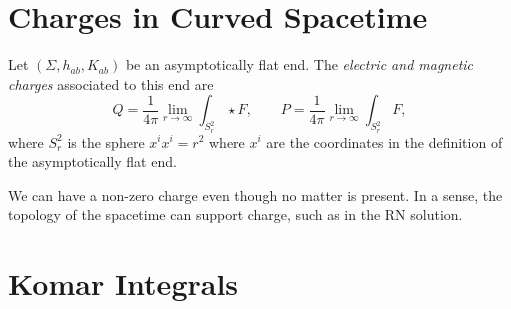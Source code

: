 \section{Charges in Curved Spacetime}%
\label{sec:charges_in_curved_spacetime}

\begin{definition}[]
  \label{def:charges}
  Let $(\Sigma, h_{ab}, K_{ab})$ be an asymptotically flat end. The \emph{electric and magnetic charges} associated to this end are 
  \begin{equation}
    Q = \frac{1}{4 \pi} \lim_{r \to \infty} \int_{S^2_r} \star F,  \qquad
    P = \frac{1}{4 \pi} \lim_{r \to \infty} \int_{S^2_r} F,
  \end{equation}
  where $S^2_r$ is the sphere $x^{i} x^{i} = r^2$ where $x^{i}$ are the coordinates in the definition of the asymptotically flat end.
\end{definition}
\begin{leftbar}
  We can have a non-zero charge even though no matter is present. In a sense, the topology of the spacetime can support charge, such as in the RN solution.
\end{leftbar}

\section{Komar Integrals}%
\label{sec:komar_integrals}

